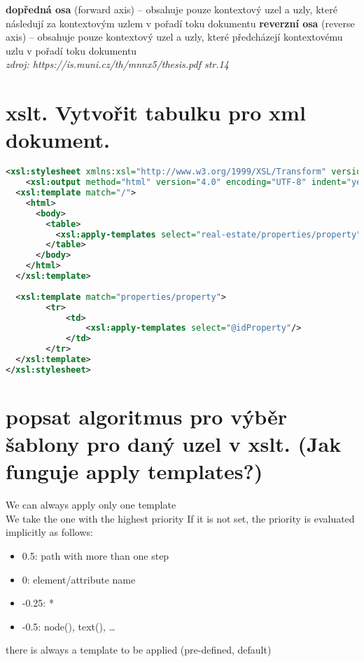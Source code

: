 \documentclass[a4paper,titlepage]{article}
\begin{document}
	\textbf{dopředná osa} (forward axis) – obsahuje pouze kontextový uzel a uzly, které následují
za kontextovým uzlem v pořadí toku dokumentu
	\textbf{reverzní osa} (reverse axis) – obsahuje pouze kontextový uzel a uzly, které předcházejí
kontextovému uzlu v pořadí toku dokumentu\\
	\textit{zdroj: https://is.muni.cz/th/mnnx5/thesis.pdf str.14}

\section{xslt. Vytvořit tabulku pro xml dokument.  }
	\begin{lstlisting}[language=XML]
<xsl:stylesheet xmlns:xsl="http://www.w3.org/1999/XSL/Transform" version="1.0">
    <xsl:output method="html" version="4.0" encoding="UTF-8" indent="yes" doctype-public="-//W3C//DTD XHTML 1.0 Strict//EN" doctype-system="http://www.w3.org/TR/xhtml1/DTD/xhtml1-strict.dtd" />
  <xsl:template match="/">
    <html>
      <body>
        <table>
          <xsl:apply-templates select="real-estate/properties/property"/>                        
        </table>
      </body>
    </html>
  </xsl:template>
    
  <xsl:template match="properties/property">
        <tr>
            <td>
                <xsl:apply-templates select="@idProperty"/>
            </td>
        </tr>
  </xsl:template>
</xsl:stylesheet>
	\end{lstlisting}
	
	
	
\section{popsat algoritmus pro výběr šablony pro daný uzel v xslt. (Jak funguje apply templates?) }
	We can always apply only one template\\
	We take the one with the highest priority
	If it is not set, the priority is evaluated implicitly as follows:	
	\begin{itemize}
		\item 0.5: path with more than one step
		\item 0: element/attribute name
		\item -0.25: *
		\item -0.5: node(), text(), …
	\end{itemize}
	there is always a template to be applied (pre-defined, default)
\end{document}
